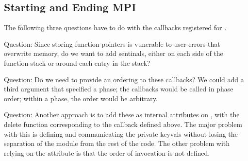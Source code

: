 \documentclass{article}
\begin{document}
\subsection{Starting and Ending MPI}

The following three questions have to do with the callbacks registered
for .

Question:
Since storing function pointers is vunerable to user-errors that
overwrite memory, do we want to add sentinals, either on each side of
the function stack or around each entry in the stack?

Question: 
Do we need to provide an ordering to these callbacks?  We could add a
third argument that specified a phase; the callbacks would be called
in phase order; within a phase, the order would be arbitrary.

Question:
Another approach is to add these as internal attributes on
, with the delete function corresponding to
the callback defined above. The major problem with this is defining
and communicating the private keyvals without losing the separation
of the module from the rest of the code.  The other problem with
relying on the attribute is that the order of invocation is not defined.

\end{document}

